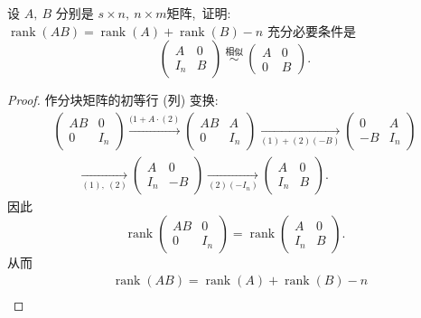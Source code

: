 \newpage
\begin{problem}
	设 $ A,\  B $ 分别是 $ s \times n ,\  n \times m  $矩阵,\  证明:
	$\operatorname{rank}(A B)=\operatorname{rank}(A)+\operatorname{rank}(B)-n $ 充分必要条件是
	$$\left(\begin{array}{ll}
		A & 0 \\
		I_{n} & B
	\end{array}\right) \stackrel{\text { 相似 }}{\sim}\left(\begin{array}{cc}
		A & 0 \\
		0 & B
	\end{array}\right) .$$
\end{problem}
\begin{proof}
	作分块矩阵的初等行 (列) 变换:
	$$\begin{array}{c}
		\left(\begin{array}{cc}
			A B & 0 \\
			0 & I_{n}
		\end{array}\right) \xrightarrow{(1+A \cdot(2)}\left(\begin{array}{cc}
			A B & A \\
			0 & I_{n}
		\end{array}\right) \xrightarrow[(1)+(2)(-B)]{}\left(\begin{array}{cc}
			0 & A \\
			-B & I_{n}
		\end{array}\right) \\
		\qquad \xrightarrow[(1),\ (2)]{}\left(\begin{array}{cc}
			A & 0 \\
			I_{n} & -B
		\end{array}\right) \xrightarrow[(2)\left(-I_{n}\right)]{}
		\left(\begin{array}{cc}
			A & 0 \\
			I_{n} & B
		\end{array}\right) .
	\end{array}$$
	因此
	$$\operatorname{rank}\left(\begin{array}{cc}
		A B & 0 \\
		0 & I_{n}
	\end{array}\right)=\operatorname{rank}\left(\begin{array}{cc}
		A & 0 \\
		I_{n} & B
	\end{array}\right) .$$
	从而
	$$
	\begin{aligned}
		&\operatorname{rank}(A B)=\operatorname{rank}(A)+\operatorname{rank}(B)-n \\

\end{aligned}$$
\end{proof}
